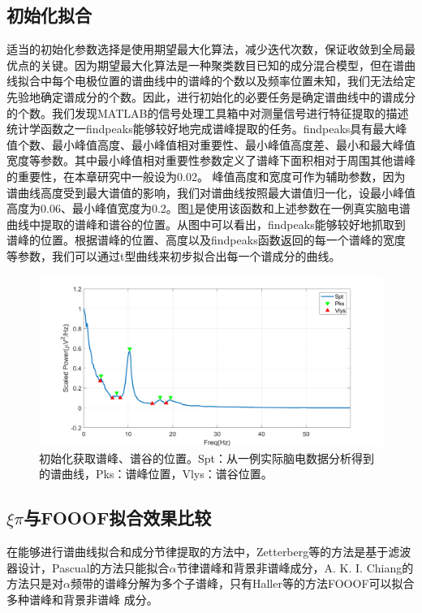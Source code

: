 \subsection{初始化拟合}
适当的初始化参数选择是使用期望最大化算法，减少迭代次数，保证收敛到全局最优点的关键。因为期望最大化算法是一种聚类数目已知的成分混合模型，但在谱曲线拟合中每个电极位置的谱曲线中的谱峰的个数以及频率位置未知，我们无法给定先验地确定谱成分的个数。因此，进行初始化的必要任务是确定谱曲线中的谱成分的个数。我们发现MATLAB的信号处理工具箱中对测量信号进行特征提取的描述统计学函数之一findpeaks能够较好地完成谱峰提取的任务。findpeaks具有最大峰值个数、最小峰值高度、最小峰值相对重要性、最小峰值高度差、最小和最大峰值宽度等参数。其中最小峰值相对重要性参数定义了谱峰下面积相对于周围其他谱峰的重要性，在本章研究中一般设为0.02。 峰值高度和宽度可作为辅助参数，因为谱曲线高度受到最大谱值的影响，我们对谱曲线按照最大谱值归一化，设最小峰值高度为0.06、最小峰值宽度为0.2。图\ref{detect}是使用该函数和上述参数在一例真实脑电谱曲线中提取的谱峰和谱谷的位置。从图中可以看出，findpeaks能够较好地抓取到谱峰的位置。根据谱峰的位置、高度以及findpeaks函数返回的每一个谱峰的宽度等参数，我们可以通过t型曲线来初步拟合出每一个谱成分的曲线。
\begin{figure}
	\includegraphics[width=15cm]{pic/xipi/detect.png}
	\caption{初始化获取谱峰、谱谷的位置。Spt：从一例实际脑电数据分析得到的谱曲线，Pks：谱峰位置，Vlys：谱谷位置。}
	\label{detect}
\end{figure}

\subsection{$\xi\pi$与FOOOF拟合效果比较}
在能够进行谱曲线拟合和成分节律提取的方法中，Zetterberg等的方法是基于滤波器设计，Pascual的方法只能拟合$\alpha$节律谱峰和背景非谱峰成分，A. K. I. Chiang的方法只是对$\alpha$频带的谱峰分解为多个子谱峰，只有Haller等的方法FOOOF可以拟合多种谱峰和背景非谱峰
成分。

